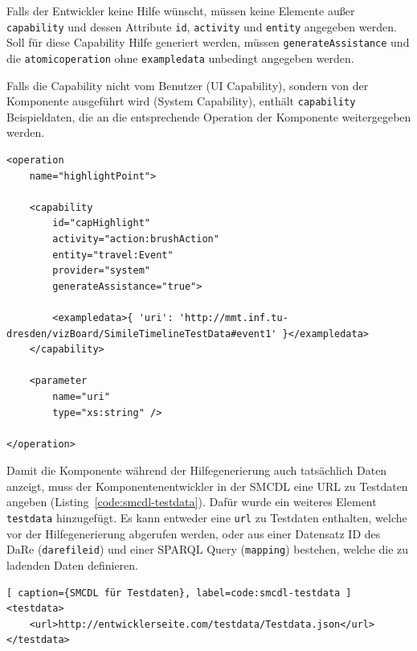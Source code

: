 \documentclass[
	headsepline,
	footsepline,
	fontsize=12pt,
	bibliography=totoc
]{scrbook}
\begin{document}
Falls der Entwickler keine Hilfe wünscht, müssen keine Elemente außer \texttt{capability} und dessen Attribute \texttt{id}, \texttt{activity} und \texttt{entity} angegeben werden. Soll für diese Capability Hilfe generiert werden, müssen \texttt{generateAssistance} und die \texttt{atomicoperation} ohne \texttt{exampledata} unbedingt angegeben werden. 

Falls die Capability nicht vom Benutzer (UI Capability), sondern von der Komponente ausgeführt wird (System Capability), enthält \texttt{capability} Beispieldaten, die an die entsprechende Operation der Komponente weitergegeben werden.

\lstset{language=XML}
\begin{lstlisting}[caption={SMCDL für System Capability}, label=code:smcdl-system]
<operation
	name="highlightPoint">
	
	<capability
		id="capHighlight"
		activity="action:brushAction"
		entity="travel:Event"
		provider="system"
		generateAssistance="true">
		
		<exampledata>{ 'uri': 'http://mmt.inf.tu-dresden/vizBoard/SimileTimelineTestData#event1' }</exampledata>
	</capability>
	
	<parameter
		name="uri"
		type="xs:string" />
	
</operation>
\end{lstlisting}

Damit die Komponente während der Hilfegenerierung auch tatsächlich Daten anzeigt, muss der Komponentenentwickler in der SMCDL eine URL zu Testdaten angeben (Listing~\ref{code:smcdl-testdata}). Dafür wurde ein weiteres Element \texttt{testdata} hinzugefügt. Es kann entweder eine \texttt{url} zu Testdaten enthalten, welche vor der Hilfegenerierung abgerufen werden, oder aus einer Datensatz ID des DaRe (\texttt{darefileid}) und einer SPARQL Query (\texttt{mapping}) bestehen, welche die zu ladenden Daten definieren.

\lstset{language=XML}
\begin{lstlisting}[ caption={SMCDL für Testdaten}, label=code:smcdl-testdata ]
<testdata>
	<url>http://entwicklerseite.com/testdata/Testdata.json</url>
</testdata>
\end{lstlisting}
\end{document}
